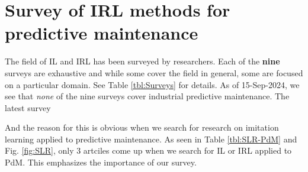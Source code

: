 \documentclass{article}
\begin{document}
\section{Survey of IRL methods for predictive maintenance}\label{sec:SLR}

The field of IL and IRL has been surveyed by researchers. Each of the \textbf{nine} surveys are exhaustive and while some cover the field in general, some are focused on a particular domain. See Table \ref{tbl:Surveys} for details. As of 15-Sep-2024, we see that \textit{none} of the nine surveys cover industrial predictive maintenance. The latest survey \citet{zare2024survey}

And the reason for this is obvious when we search for research on imitation learning applied to predictive maintenance. As seen in Table \ref{tbl:SLR-PdM} and Fig. \ref{fig:SLR}, only 3 artciles come up when we search for IL or IRL applied to PdM. This emphasizes the importance of our survey. 
\end{document}
